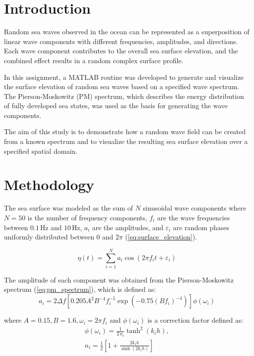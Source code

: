 \documentclass[a4paper, 11pt]{article}
\begin{document}
\listoffigures
\newpage

\section{Introduction}

\hspace*{0.5cm}Random sea waves observed in the ocean can be represented as a superposition of linear wave components with different frequencies, amplitudes, and directions. Each wave component contributes to the overall sea surface elevation, and the combined effect results in a random complex surface profile. 

In this assignment, a MATLAB routine was developed to generate and visualize the surface elevation of random sea waves based on a specified wave spectrum. The Pierson-Moskowitz (PM) spectrum, which describes the energy distribution of fully developed sea states, was used as the basis for generating the wave components. 

The aim of this study is to demonstrate how a random wave field can be created from a known spectrum and to visualize the resulting sea surface elevation over a specified spatial domain. 

\section{Methodology}

\hspace*{0.5cm}The sea surface was modeled as the sum of $N$ sinusoidal wave components where $N = 50$ is the number of frequency components, $f_i$ are the wave frequencies between $0.1\,\mathrm{Hz}$ and $10\,\mathrm{Hz}$, $a_i$ are the amplitudes, and $\varepsilon_i$ are random phases uniformly distributed between $0$ and $2\pi$ (\autoref{eq:surface_elevation}).

\begin{equation}
    \eta(t) = \sum_{i=1}^{N} a_i \cos(2 \pi f_i t + \varepsilon_i)
    \label{eq:surface_elevation}
\end{equation}

The amplitude of each component was obtained from the Pierson-Moskowitz spectrum (\autoref{eq:pm_spectrum}), which is defined as:
\begin{equation}
    a_i = 2\Delta f [0.205A^2B^{-4}f_i^{-5} \exp(-0.75(Bf_i)^{-4})]\phi(\omega_i)
    \label{eq:pm_spectrum}
\end{equation}

where $A = 0.15, B = 1.6, \omega_i = 2\pi f_i$ and $\phi(\omega_i)$ is a correction factor defined as:
\begin{equation}
\begin{split}
\phi(\omega_i) = \frac{1}{2\,n_i}\tanh^2\!(k_i h),\\
n_i = \frac{1}{2}\left[1+\frac{2k_i h}{\sinh(2k_i h)}\right]
\end{split}
\label{eq:phi}
\end{equation}
\end{document}

